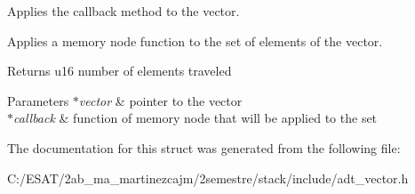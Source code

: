 Applies the callback method to the vector. 

Applies a memory node function to the set of elements of the vector.

\begin{DoxyReturn}{Returns}
u16 number of elements traveled 
\end{DoxyReturn}

\begin{DoxyParams}{Parameters}
{\em $\ast$vector} & pointer to the vector \\
\hline
{\em $\ast$callback} & function of memory node that will be applied to the set \\
\hline
\end{DoxyParams}


The documentation for this struct was generated from the following file\+:\begin{DoxyCompactItemize}
\item 
C\+:/\+E\+S\+A\+T/2ab\+\_\+ma\+\_\+martinezcajm/2semestre/stack/include/adt\+\_\+vector.\+h\end{DoxyCompactItemize}
